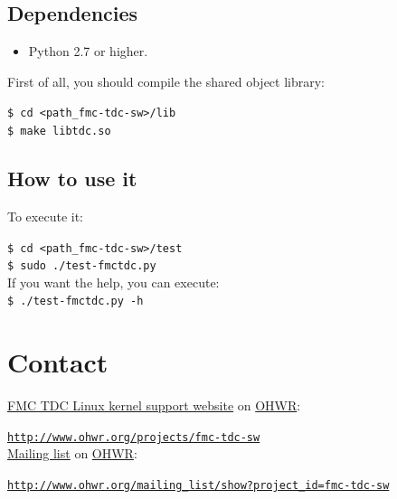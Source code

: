 \documentclass[a4paper,11pt]{article}
\begin{document}
\subsection{Dependencies}
\begin{itemize}
  \item Python 2.7 or higher.
\end{itemize}
First of all, you should compile the shared object library:

\indent\indent\texttt{\$ cd <path\_fmc-tdc-sw>/lib} \\
\indent\indent\texttt{\$ make libtdc.so}

\subsection{How to use it}

To execute it:

\indent\indent\texttt{\$ cd <path\_fmc-tdc-sw>/test} \\
\indent\indent\texttt{\$ sudo ./test-fmctdc.py} \\
If you want the help, you can execute:\\
\indent\indent\texttt{\$ ./test-fmctdc.py -h} \\

\section{Contact}
\href{http://www.ohwr.org/projects/fmc-tdc-sw}{FMC TDC Linux kernel support website} on \href{http://www.ohwr.org/}{OHWR}:

\indent\indent\texttt{\url{http://www.ohwr.org/projects/fmc-tdc-sw}}\\
\href{http://www.ohwr.org/mailing_list/show?project_id=fmc-tdc-sw}{Mailing list} on \href{http://www.ohwr.org/}{OHWR}:

\indent\indent\texttt{\url{http://www.ohwr.org/mailing_list/show?project_id=fmc-tdc-sw}}
\end{document}
